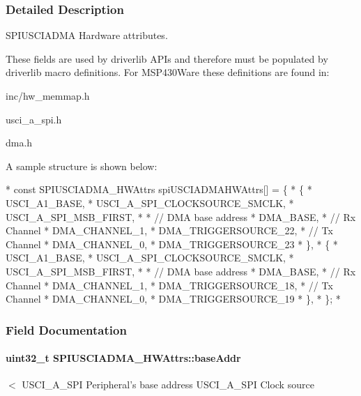 \subsubsection{Detailed Description}
S\-P\-I\-U\-S\-C\-I\-A\-D\-M\-A Hardware attributes. 

These fields are used by driverlib A\-P\-Is and therefore must be populated by driverlib macro definitions. For M\-S\-P430\-Ware these definitions are found in\-:
\begin{DoxyItemize}
\item inc/hw\-\_\-memmap.\-h
\item usci\-\_\-a\-\_\-spi.\-h
\item dma.\-h
\end{DoxyItemize}

A sample structure is shown below\-: 
\begin{DoxyCode}
*  \textcolor{keyword}{const} SPIUSCIADMA_HWAttrs spiUSCIADMAHWAttrs[] = \{
*      \{
*          USCI\_A1\_BASE,
*          USCI\_A\_SPI\_CLOCKSOURCE\_SMCLK,
*          USCI\_A\_SPI\_MSB\_FIRST,
*
*          \textcolor{comment}{// DMA base address}
*          DMA\_BASE,
*          \textcolor{comment}{// Rx Channel}
*          DMA\_CHANNEL\_1,
*          DMA\_TRIGGERSOURCE\_22,
*          \textcolor{comment}{// Tx Channel}
*          DMA\_CHANNEL\_0,
*          DMA\_TRIGGERSOURCE\_23
*      \},
*      \{
*          USCI\_A1\_BASE,
*          USCI\_A\_SPI\_CLOCKSOURCE\_SMCLK,
*          USCI\_A\_SPI\_MSB\_FIRST,
*
*          \textcolor{comment}{// DMA base address}
*          DMA\_BASE,
*          \textcolor{comment}{// Rx Channel}
*          DMA\_CHANNEL\_1,
*          DMA\_TRIGGERSOURCE\_18,
*          \textcolor{comment}{// Tx Channel}
*          DMA\_CHANNEL\_0,
*          DMA\_TRIGGERSOURCE\_19
*      \},
*  \};
*  
\end{DoxyCode}
 

\subsubsection{Field Documentation}
\paragraph[{base\-Addr}]{\setlength{\rightskip}{0pt plus 5cm}uint32\-\_\-t S\-P\-I\-U\-S\-C\-I\-A\-D\-M\-A\-\_\-\-H\-W\-Attrs\-::base\-Addr}\label{struct_s_p_i_u_s_c_i_a_d_m_a___h_w_attrs_a12d6702a8f9d28940b3c1a8791105fd1}
$<$ U\-S\-C\-I\-\_\-\-A\-\_\-\-S\-P\-I Peripheral's base address U\-S\-C\-I\-\_\-\-A\-\_\-\-S\-P\-I Clock source 
